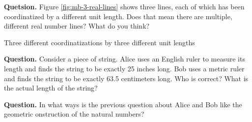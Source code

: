 \small\textbf{Quetsion.} Figure \ref{fig:mb-3-real-lines} shows three lines, each of which has been coordinatized by a different unit length. Does that mean there are multiple, different real number lines? What do you think?

\begin{marginfigure}
  
  \caption{\label{fig:mb-3-real-lines} Three different coordinatizations by three different unit lengths}
\end{marginfigure}

\textbf{Question.} Consider a piece of string. Alice uses an English ruler to measure its length and finds the string to be exactly 25 inches long. Bob uses a metric ruler and finds the string to be exactly 63.5 centimeters long. Who is correct? What is the actual length of the string?

\textbf{Question.} In what ways is the previous question about Alice and Bob like the geometric onstruction of the natural numbers?
\normalsize


%
%
%
%
%

